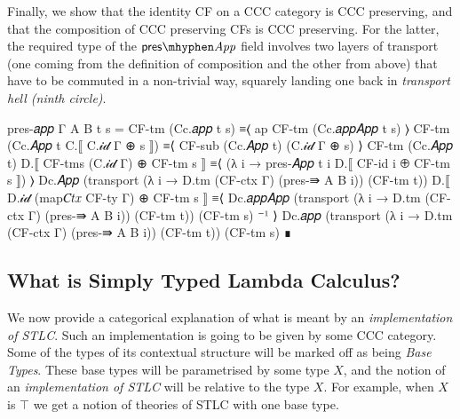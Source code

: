 Finally, we show that the identity CF on a CCC category is CCC preserving, and
that the composition of CCC preserving CFs is CCC preserving. For the latter,
the required type of the $\mathsf{pres\mhyphen}\mathit{App}$ field involves two
layers of transport (one coming from the definition of composition and the other
from above) that have to be commuted in a non-trivial way, squarely landing one
back in \emph{transport hell (ninth circle)}.

\begin{code}[hide]
  pres-𝑎𝑝𝑝 {Γ} {A} {B} t s =
    CF-tm (Cc.𝑎𝑝𝑝 t s)
      ≡⟨ ap CF-tm (Cc.𝑎𝑝𝑝𝐴𝑝𝑝 t s) ⟩
    CF-tm (Cc.𝐴𝑝𝑝 t C.⟦ C.𝒾𝒹 Γ ⊕ s ⟧)
      ≡⟨ CF-sub (Cc.𝐴𝑝𝑝 t) (C.𝒾𝒹 Γ ⊕ s) ⟩
    CF-tm (Cc.𝐴𝑝𝑝 t) D.⟦ CF-tms (C.𝒾𝒹 Γ) ⊕ CF-tm s ⟧
      ≡⟨ (λ i → pres-𝐴𝑝𝑝 t i D.⟦ CF-id i ⊕  CF-tm s ⟧) ⟩
    Dc.𝐴𝑝𝑝 (transport (λ i → D.tm (CF-ctx Γ) (pres-⇛ A B i)) (CF-tm t))
      D.⟦ D.𝒾𝒹 (map𝐶𝑡𝑥 CF-ty Γ) ⊕ CF-tm s ⟧
      ≡⟨ Dc.𝑎𝑝𝑝𝐴𝑝𝑝 (transport (λ i → D.tm (CF-ctx Γ) (pres-⇛ A B i)) (CF-tm t)) (CF-tm s) ⁻¹ ⟩
    Dc.𝑎𝑝𝑝 (transport (λ i → D.tm (CF-ctx Γ) (pres-⇛ A B i)) (CF-tm t)) (CF-tm s)
      ∎
\end{code}

\subsection{What is Simply Typed Lambda Calculus?}

We now provide a categorical explanation of what is meant by an
\emph{implementation of STLC}. Such an implementation is going to be given by
some CCC category. Some of the types of its contextual structure will be marked
off as being \emph{Base Types}. These base types will be parametrised by some
type $X$, and the notion of an \emph{implementation of STLC} will be relative to
the type $X$. For example, when $X$ is $\top$ we get a notion of theories of
STLC with one base type.

